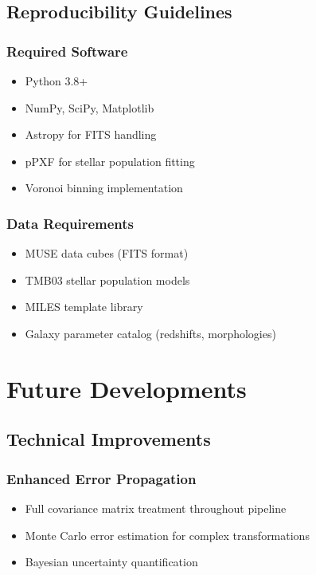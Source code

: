 \documentclass[12pt,a4paper]{article}
\begin{document}
\subsection{Reproducibility Guidelines}

\subsubsection{Required Software}
\begin{itemize}
    \item Python 3.8+
    \item NumPy, SciPy, Matplotlib
    \item Astropy for FITS handling
    \item pPXF for stellar population fitting
    \item Voronoi binning implementation
\end{itemize}

\subsubsection{Data Requirements}
\begin{itemize}
    \item MUSE data cubes (FITS format)
    \item TMB03 stellar population models
    \item MILES template library
    \item Galaxy parameter catalog (redshifts, morphologies)
\end{itemize}

\section{Future Developments}

\subsection{Technical Improvements}

\subsubsection{Enhanced Error Propagation}
\begin{itemize}
    \item Full covariance matrix treatment throughout pipeline
    \item Monte Carlo error estimation for complex transformations
    \item Bayesian uncertainty quantification
\end{itemize}
\end{document}
